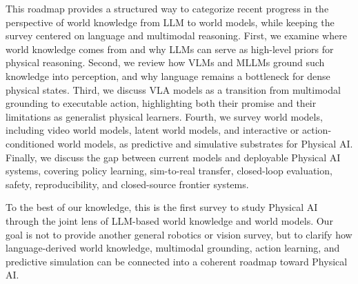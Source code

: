 This roadmap provides a structured way to categorize recent progress in the perspective of world knowledge from LLM to world models, while keeping the survey centered on language and multimodal reasoning. 
First, we examine where world knowledge comes from and why LLMs can serve as high-level priors for physical reasoning. 
Second, we review how VLMs and MLLMs ground such knowledge into perception, and why language remains a bottleneck for dense physical states. 
Third, we discuss VLA models as a transition from multimodal grounding to executable action, highlighting both their promise and their limitations as generalist physical learners. 
Fourth, we survey world models, including video world models, latent world models, and interactive or action-conditioned world models, as predictive and simulative substrates for Physical AI. 
Finally, we discuss the gap between current models and deployable Physical AI systems, covering policy learning, sim-to-real transfer, closed-loop evaluation, safety, reproducibility, and closed-source frontier systems.

To the best of our knowledge, this is the first survey to study Physical AI through the joint lens of LLM-based world knowledge and world models. 
Our goal is not to provide another general robotics or vision survey, but to clarify how language-derived world knowledge, multimodal grounding, action learning, and predictive simulation can be connected into a coherent roadmap toward Physical AI.

